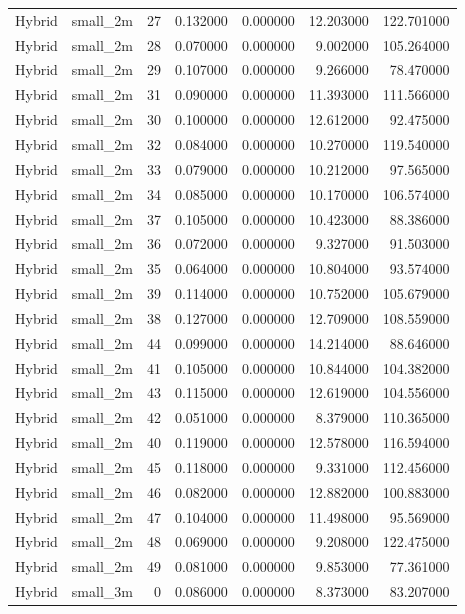 \begin{tabular}{llrrrrr}
Hybrid & small_2m & 27 & 0.132000 & 0.000000 & 12.203000 & 122.701000 \\
Hybrid & small_2m & 28 & 0.070000 & 0.000000 & 9.002000 & 105.264000 \\
Hybrid & small_2m & 29 & 0.107000 & 0.000000 & 9.266000 & 78.470000 \\
Hybrid & small_2m & 31 & 0.090000 & 0.000000 & 11.393000 & 111.566000 \\
Hybrid & small_2m & 30 & 0.100000 & 0.000000 & 12.612000 & 92.475000 \\
Hybrid & small_2m & 32 & 0.084000 & 0.000000 & 10.270000 & 119.540000 \\
Hybrid & small_2m & 33 & 0.079000 & 0.000000 & 10.212000 & 97.565000 \\
Hybrid & small_2m & 34 & 0.085000 & 0.000000 & 10.170000 & 106.574000 \\
Hybrid & small_2m & 37 & 0.105000 & 0.000000 & 10.423000 & 88.386000 \\
Hybrid & small_2m & 36 & 0.072000 & 0.000000 & 9.327000 & 91.503000 \\
Hybrid & small_2m & 35 & 0.064000 & 0.000000 & 10.804000 & 93.574000 \\
Hybrid & small_2m & 39 & 0.114000 & 0.000000 & 10.752000 & 105.679000 \\
Hybrid & small_2m & 38 & 0.127000 & 0.000000 & 12.709000 & 108.559000 \\
Hybrid & small_2m & 44 & 0.099000 & 0.000000 & 14.214000 & 88.646000 \\
Hybrid & small_2m & 41 & 0.105000 & 0.000000 & 10.844000 & 104.382000 \\
Hybrid & small_2m & 43 & 0.115000 & 0.000000 & 12.619000 & 104.556000 \\
Hybrid & small_2m & 42 & 0.051000 & 0.000000 & 8.379000 & 110.365000 \\
Hybrid & small_2m & 40 & 0.119000 & 0.000000 & 12.578000 & 116.594000 \\
Hybrid & small_2m & 45 & 0.118000 & 0.000000 & 9.331000 & 112.456000 \\
Hybrid & small_2m & 46 & 0.082000 & 0.000000 & 12.882000 & 100.883000 \\
Hybrid & small_2m & 47 & 0.104000 & 0.000000 & 11.498000 & 95.569000 \\
Hybrid & small_2m & 48 & 0.069000 & 0.000000 & 9.208000 & 122.475000 \\
Hybrid & small_2m & 49 & 0.081000 & 0.000000 & 9.853000 & 77.361000 \\
Hybrid & small_3m & 0 & 0.086000 & 0.000000 & 8.373000 & 83.207000 \\

\end{tabular}

